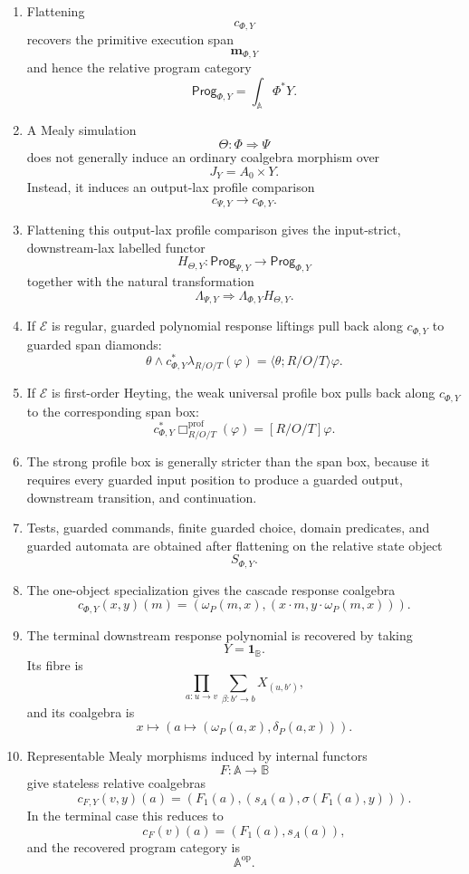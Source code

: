 \begin{theorem}
\begin{enumerate}
\item Flattening
\[
c_{\Phi,Y}
\]
recovers the primitive execution span
\[
\mathbf m_{\Phi,Y}
\]
and hence the relative program category
\[
\mathsf{Prog}_{\Phi,Y}
=
\int_{\mathbb A}\Phi^\ast Y.
\]

\item A Mealy simulation
\[
\Theta:\Phi\Rightarrow\Psi
\]
does not generally induce an ordinary coalgebra morphism over
\[
J_Y=A_0\times Y.
\]
Instead, it induces an output-lax profile comparison
\[
c_{\Psi,Y}\longrightarrow c_{\Phi,Y}.
\]

\item Flattening this output-lax profile comparison gives the input-strict,
downstream-lax labelled functor
\[
H_{\Theta,Y}:
\mathsf{Prog}_{\Psi,Y}\to\mathsf{Prog}_{\Phi,Y}
\]
together with the natural transformation
\[
\Lambda_{\Psi,Y}
\Rightarrow
\Lambda_{\Phi,Y}H_{\Theta,Y}.
\]

\item If \(\mathcal E\) is regular, guarded polynomial response liftings pull
back along \(c_{\Phi,Y}\) to guarded span diamonds:
\[
\theta\wedge c_{\Phi,Y}^{\ast}\lambda_{R/O/T}(\varphi)
=
\langle\theta;R/O/T\rangle\varphi.
\]

\item If \(\mathcal E\) is first-order Heyting, the weak universal profile box
pulls back along \(c_{\Phi,Y}\) to the corresponding span box:
\[
c_{\Phi,Y}^{\ast}
\Box^{\mathrm{prof}}_{R/O/T}(\varphi)
=
[R/O/T]\varphi.
\]

\item The strong profile box is generally stricter than the span box, because
it requires every guarded input position to produce a guarded output,
downstream transition, and continuation.

\item Tests, guarded commands, finite guarded choice, domain predicates, and
guarded automata are obtained after flattening on the relative state object
\[
S_{\Phi,Y}.
\]

\item The one-object specialization gives the cascade response coalgebra
\[
c_{\Phi,Y}(x,y)(m)
=
\left(
\omega_P(m,x),
\left(
x\cdot m,
y\cdot\omega_P(m,x)
\right)
\right).
\]

\item The terminal downstream response polynomial is recovered by taking
\[
Y=\mathbf 1_{\mathbb B}.
\]
Its fibre is
\[
\prod_{a:u\to v}
\sum_{\beta:b'\to b}
X_{(u,b')},
\]
and its coalgebra is
\[
x\longmapsto
\left(
a\longmapsto(\omega_P(a,x),\delta_P(a,x))
\right).
\]

\item Representable Mealy morphisms induced by internal functors
\[
F:\mathbb A\to\mathbb B
\]
give stateless relative coalgebras
\[
c_{F,Y}(v,y)(a)
=
\left(
F_1(a),
\left(
s_A(a),
\sigma(F_1(a),y)
\right)
\right).
\]
In the terminal case this reduces to
\[
c_F(v)(a)=(F_1(a),s_A(a)),
\]
and the recovered program category is
\[
\mathbb A^{\mathrm{op}}.
\]
\end{enumerate}
\end{theorem}

